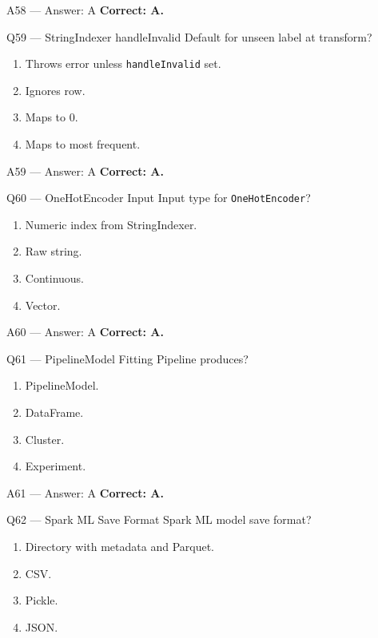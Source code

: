 \documentclass[aspectratio=169,9pt]{beamer}
\begin{document}
	\begin{frame}{A58 — Answer: A}
		\textbf{Correct: A.}
	\end{frame}
	
	\begin{frame}{Q59 — StringIndexer handleInvalid}
		Default for unseen label at transform?
		\begin{enumerate}[label=\Alph*.]
			\item Throws error unless \texttt{handleInvalid} set.
			\item Ignores row.
			\item Maps to 0.
			\item Maps to most frequent.
		\end{enumerate}
	\end{frame}
	
	\begin{frame}{A59 — Answer: A}
		\textbf{Correct: A.}
	\end{frame}
	
	\begin{frame}{Q60 — OneHotEncoder Input}
		Input type for \texttt{OneHotEncoder}?
		\begin{enumerate}[label=\Alph*.]
			\item Numeric index from StringIndexer.
			\item Raw string.
			\item Continuous.
			\item Vector.
		\end{enumerate}
	\end{frame}
	
	\begin{frame}{A60 — Answer: A}
		\textbf{Correct: A.}
	\end{frame}
	
	\begin{frame}{Q61 — PipelineModel}
		Fitting Pipeline produces?
		\begin{enumerate}[label=\Alph*.]
			\item PipelineModel.
			\item DataFrame.
			\item Cluster.
			\item Experiment.
		\end{enumerate}
	\end{frame}
	
	\begin{frame}{A61 — Answer: A}
		\textbf{Correct: A.}
	\end{frame}
	
	\begin{frame}{Q62 — Spark ML Save Format}
		Spark ML model save format?
		\begin{enumerate}[label=\Alph*.]
			\item Directory with metadata and Parquet.
			\item CSV.
			\item Pickle.
			\item JSON.
		\end{enumerate}
	\end{frame}
	
\end{document}
